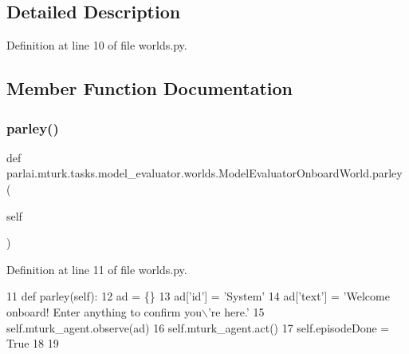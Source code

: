 \subsection{Detailed Description}


Definition at line 10 of file worlds.\+py.



\subsection{Member Function Documentation}
\mbox{\label{classparlai_1_1mturk_1_1tasks_1_1model__evaluator_1_1worlds_1_1ModelEvaluatorOnboardWorld_a1ac5cd28dd7c3733b9f0ee491f476363}} 
\subsubsection{\texorpdfstring{parley()}{parley()}}
{\footnotesize\ttfamily def parlai.\+mturk.\+tasks.\+model\+\_\+evaluator.\+worlds.\+Model\+Evaluator\+Onboard\+World.\+parley (\begin{DoxyParamCaption}\item[{}]{self }\end{DoxyParamCaption})}



Definition at line 11 of file worlds.\+py.


\begin{DoxyCode}
11     \textcolor{keyword}{def }parley(self):
12         ad = \{\}
13         ad[\textcolor{stringliteral}{'id'}] = \textcolor{stringliteral}{'System'}
14         ad[\textcolor{stringliteral}{'text'}] = \textcolor{stringliteral}{'Welcome onboard! Enter anything to confirm you\(\backslash\)'re here.'}
15         self.mturk\_agent.observe(ad)
16         self.mturk\_agent.act()
17         self.episodeDone = \textcolor{keyword}{True}
18 
19 
\end{DoxyCode}


